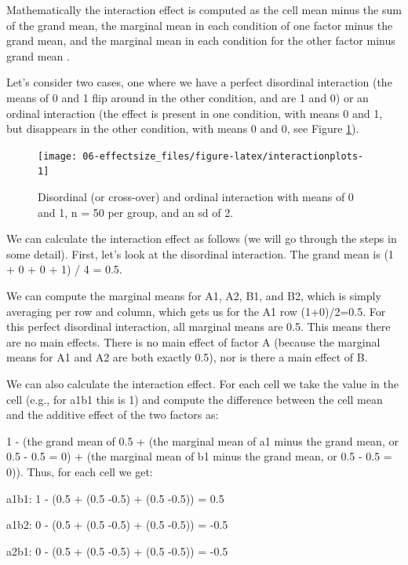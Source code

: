 \documentclass[
  oneside]{krantz}
\begin{document}
Mathematically the interaction effect is computed as the cell mean minus the sum of the grand mean, the marginal mean in each condition of one factor minus the grand mean, and the marginal mean in each condition for the other factor minus grand mean \citep{maxwell_designing_2004}.

Let's consider two cases, one where we have a perfect disordinal interaction (the means of 0 and 1 flip around in the other condition, and are 1 and 0) or an ordinal interaction (the effect is present in one condition, with means 0 and 1, but disappears in the other condition, with means 0 and 0, see Figure \ref{fig:interactionplots}).



\begin{figure}

{\centering \texttt{[image: 06-effectsize\_files/figure-latex/interactionplots-1]} 

}

\caption{Disordinal (or cross-over) and ordinal interaction with means of 0 and 1, n = 50 per group, and an sd of 2.}\label{fig:interactionplots}
\end{figure}

We can calculate the interaction effect as follows (we will go through the steps in some detail). First, let's look at the disordinal interaction. The grand mean is (1 + 0 + 0 + 1) / 4 = 0.5.

We can compute the marginal means for A1, A2, B1, and B2, which is simply averaging per row and column, which gets us for the A1 row (1+0)/2=0.5. For this perfect disordinal interaction, all marginal means are 0.5. This means there are no main effects. There is no main effect of factor A (because the marginal means for A1 and A2 are both exactly 0.5), nor is there a main effect of B.

We can also calculate the interaction effect. For each cell we take the value in the cell (e.g., for a1b1 this is 1) and compute the difference between the cell mean and the additive effect of the two factors as:

1 - (the grand mean of 0.5 + (the marginal mean of a1 minus the grand mean, or 0.5 - 0.5 = 0) + (the marginal mean of b1 minus the grand mean, or 0.5 - 0.5 = 0)). Thus, for each cell we get:

a1b1: 1 - (0.5 + (0.5 -0.5) + (0.5 -0.5)) = 0.5

a1b2: 0 - (0.5 + (0.5 -0.5) + (0.5 -0.5)) = -0.5

a2b1: 0 - (0.5 + (0.5 -0.5) + (0.5 -0.5)) = -0.5
\end{document}
